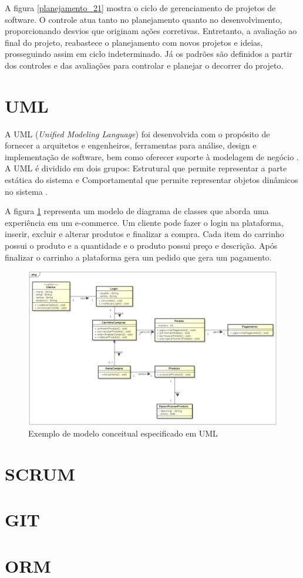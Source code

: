 A figura \ref{planejamento_21} mostra o ciclo de gerenciamento de projetos de software. O controle atua tanto no planejamento quanto no desenvolvimento, proporcionando desvios que originam ações corretivas. Entretanto, a avaliação ao final do projeto, reabastece o planejamento com novos projetos e ideias, prosseguindo assim em ciclo indeterminado. Já os padrões são definidos a partir dos controles e das avaliações para controlar e planejar o decorrer do projeto.


\section{UML}
A UML (\textit{Unified Modeling Language}) foi desenvolvida com o propósito de fornecer a
arquitetos e engenheiros, ferramentas para análise, design e implementação de software, bem
como oferecer suporte à modelagem de negócio \cite{gasparini2018driv}. A UML é dividido em dois grupos: Estrutural que permite representar a parte estática do sistema e Comportamental que permite representar objetos dinâmicos no sistema \cite{silva2018sasml}.

A figura \ref{Exemplo_UML} representa um modelo de diagrama de classes que aborda uma experiência em um e-commerce. Um cliente pode fazer o login na plataforma, inserir, excluir e alterar produtos e finalizar a compra. Cada item do carrinho possui o produto e a quantidade e o produto possui preço e descrição.
Após finalizar o carrinho a plataforma gera um pedido que gera um pagamento.
\begin{figure}[htb]
	\caption{\label{Exemplo_UML} Exemplo de modelo conceitual especificado em UML}
	\begin{center}
		\includegraphics[scale=0.45]{./Figuras/Exemplo_UML.png}
	\end{center}
\end{figure}


\section{SCRUM}

\section{GIT}

\section{ORM}